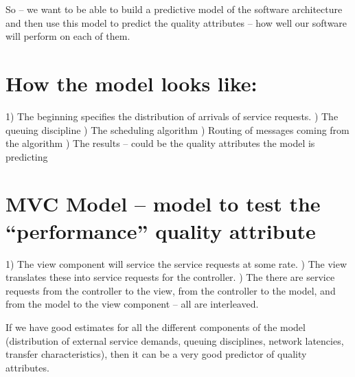 \documentclass{report}
\begin{document}
So – we want to be able to build a predictive model of the software architecture and then use this model to predict the quality attributes – how well our software will perform on each of them.

\section{How the model looks like:}
1)  The beginning specifies the distribution of arrivals of service requests. )  The queuing discipline )  The scheduling algorithm  )  Routing of messages coming from the algorithm  )  The results – could be the quality attributes the model is predicting \newline

\section{MVC Model – model to test the “performance” quality attribute}
1) The view component will service the service requests at some rate.  ) The view translates these into service requests for the controller.  ) The there are service requests from the controller to the view, from the controller to the model, and from the model to the view component – all are interleaved.  \newline

If we have good estimates for all the different components of the model (distribution of external service demands, queuing disciplines, network latencies, transfer characteristics), then it can be a very good predictor of quality attributes.
\end{document}
